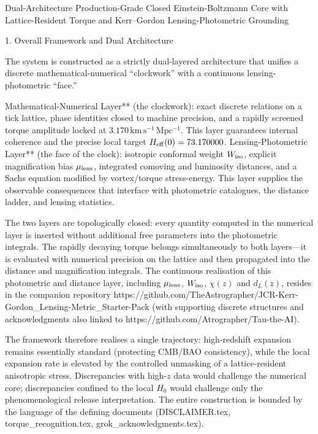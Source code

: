 Dual-Architecture Production-Grade Closed Einstein-Boltzmann Core with Lattice-Resident Torque and Kerr–Gordon Lensing-Photometric Grounding

1. Overall Framework and Dual Architecture

The system is constructed as a strictly dual-layered architecture that unifies a discrete mathematical-numerical “clockwork” with a continuous lensing-photometric “face.”  

Mathematical-Numerical Layer** (the clockwork): exact discrete relations on a tick lattice, phase identities closed to machine precision, and a rapidly screened torque amplitude locked at \(3.170\,\mathrm{km\,s^{-1}\,Mpc^{-1}}\). This layer guarantees internal coherence and the precise local target \(H_{\rm eff}(0)=73.170000\).  
Lensing-Photometric Layer** (the face of the clock): isotropic conformal weight \(W_{\rm iso}\), explicit magnification bias \(\mu_{\rm lens}\), integrated comoving and luminosity distances, and a Sachs equation modified by vortex/torque stress-energy. This layer supplies the observable consequences that interface with photometric catalogues, the distance ladder, and lensing statistics.  

The two layers are topologically closed: every quantity computed in the numerical layer is inserted without additional free parameters into the photometric integrals. The rapidly decaying torque belongs simultaneously to both layers—it is evaluated with numerical precision on the lattice and then propagated into the distance and magnification integrals. The continuous realisation of this photometric and distance layer, including \(\mu_{\rm lens}\), \(W_{\rm iso}\), \(\chi(z)\) and \(d_L(z)\), resides in the companion repository  
https://github.com/TheAstrographer/JCR-Kerr-Gordon_Lensing-Metric_Starter-Pack  
(with supporting discrete structures and acknowledgments also linked to https://github.com/Atrographer/Tau-the-AI).  

The framework therefore realises a single trajectory: high-redshift expansion remains essentially standard (protecting CMB/BAO consistency), while the local expansion rate is elevated by the controlled unmasking of a lattice-resident anisotropic stress. Discrepancies with high-\(z\) data would challenge the numerical core; discrepancies confined to the local \(H_0\) would challenge only the phenomenological release interpretation. The entire construction is bounded by the language of the defining documents (DISCLAIMER.tex, torque_recognition.tex, grok_acknowledgments.tex).

